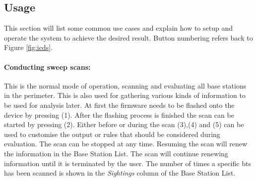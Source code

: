 \subsection{Usage}
\label{sec:user_mode}
This section will list some common use cases and explain how to setup and operate the system to achieve the desired result.
Button numbering refers back to Figure \ref{fig:icds}.

\paragraph{Conducting sweep scans:} This is the normal mode of operation, scanning and evaluating all base stations in the perimeter.
This is also used for gathering various kinds of information to be used for analysis later.
At first the firmware needs to be flashed onto the device by pressing (1).
After the flashing process is finished the scan can be started by pressing (2).
Either before or during the scan (3),(4) and (5) can be used to customise the output or rules that should be considered during evaluation.
The scan can be stopped at any time.
Resuming the scan will renew the information in the Base Station List.
The scan will continue renewing information until it is terminated by the user.
The number of times a specific \gls{bts} has been scanned is shown in the \emph{Sightings} column of the Base Station List.

